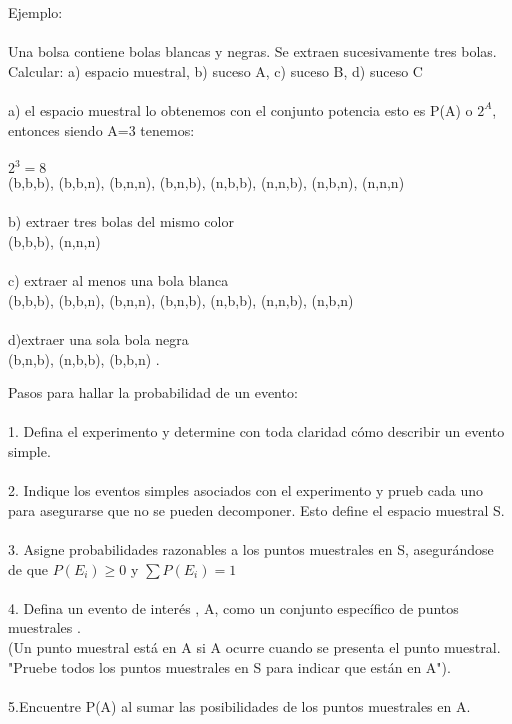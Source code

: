 \documentclass[]{article}
\begin{document}
Ejemplo:\\\\
Una bolsa contiene bolas blancas y negras. Se extraen sucesivamente tres bolas.\\
Calcular: a) espacio muestral, b) suceso A, c) suceso B, d) suceso C\\\\
a) el espacio muestral lo obtenemos con el conjunto potencia esto es P(A) o $2^{A}$, entonces siendo A=3 tenemos:\\\\
$2^{3}=8$\\
(b,b,b), (b,b,n), (b,n,n), (b,n,b), (n,b,b), (n,n,b), (n,b,n), (n,n,n)\\\\
b) extraer tres bolas del mismo color \\
(b,b,b), (n,n,n)\\\\
c) extraer al menos una bola blanca \\
(b,b,b), (b,b,n), (b,n,n), (b,n,b), (n,b,b), (n,n,b), (n,b,n)\\\\
d)extraer una sola bola negra\\
(b,n,b), (n,b,b), (b,b,n) .
 
 \newpage

Pasos para hallar la probabilidad de un evento:\\\\
1. Defina el experimento y determine con toda claridad c\'omo describir un evento simple.\\\\
2. Indique los eventos simples asociados con el experimento y prueb cada uno para asegurarse que no se pueden decomponer. Esto define el espacio muestral S.\\\\
3. Asigne probabilidades razonables a los puntos muestrales en S, asegur\'andose de que $P(E_{i}) \geq 0$ y $\sum P(E_{i}) = 1$ \\\\
4. Defina un evento de inter\'es , A, como un conjunto espec\'ifico de puntos muestrales . \\(Un punto muestral est\'a en A si A ocurre cuando se presenta el punto muestral. "Pruebe todos los puntos muestrales en S para indicar que est\'an en A").\\\\
5.Encuentre P(A) al sumar las posibilidades de los puntos muestrales en A. 
\end{document}
